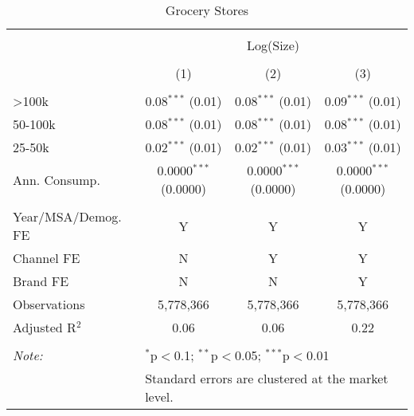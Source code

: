 
\begin{table}[!htbp] \centering 
  \caption{Grocery Stores} 
  \label{tab:packageSizeGrocerySoda} 
\begin{tabular}{@{\extracolsep{5pt}}lccc} 
\\[-1.8ex]\hline 
\hline \\[-1.8ex] 
 & \multicolumn{3}{c}{Log(Size)} \\ 
\\[-1.8ex] & (1) & (2) & (3)\\ 
\hline \\[-1.8ex] 
 >100k & 0.08$^{***}$ (0.01) & 0.08$^{***}$ (0.01) & 0.09$^{***}$ (0.01) \\ 
  50-100k & 0.08$^{***}$ (0.01) & 0.08$^{***}$ (0.01) & 0.08$^{***}$ (0.01) \\ 
  25-50k & 0.02$^{***}$ (0.01) & 0.02$^{***}$ (0.01) & 0.03$^{***}$ (0.01) \\ 
  Ann. Consump. & 0.0000$^{***}$ (0.0000) & 0.0000$^{***}$ (0.0000) & 0.0000$^{***}$ (0.0000) \\ 
 \hline \\[-1.8ex] 
Year/MSA/Demog. FE & Y & Y & Y \\ 
Channel FE & N & Y & Y \\ 
Brand FE & N & N & Y \\ 
Observations & 5,778,366 & 5,778,366 & 5,778,366 \\ 
Adjusted R$^{2}$ & 0.06 & 0.06 & 0.22 \\ 
\hline 
\hline \\[-1.8ex] 
\textit{Note:}  & \multicolumn{3}{l}{$^{*}$p$<$0.1; $^{**}$p$<$0.05; $^{***}$p$<$0.01} \\ 
 & \multicolumn{3}{l}{Standard errors are clustered at the market level.} \\ 
\end{tabular} 
\end{table} 
